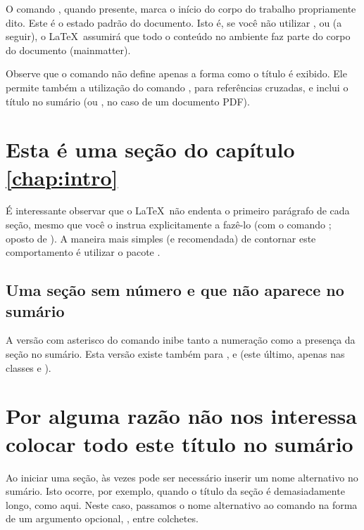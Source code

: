 \documentclass[a4paper,12pt]{book}
\begin{document}
	O comando , quando presente, marca o início do corpo do
	trabalho propriamente dito. Este é o estado padrão do documento. Isto é, se
	você não utilizar ,  ou  (a
	seguir), o \LaTeX\ assumirá que todo o conteúdo no ambiente 
	faz	parte do corpo do	documento (mainmatter).	
	
	Observe que o comando  não define apenas a forma como o título é
	exibido. Ele permite também a utilização do comando , para
	referências cruzadas, e inclui o título no sumário (ou ,
	no caso de um documento PDF).
	
	\section{Esta é uma seção do capítulo \ref{chap:intro}}
		\label{sec:sec}
		
	É interessante observar que o \LaTeX\ não endenta o primeiro parágrafo de 
	cada seção, mesmo que você o instrua explicitamente a fazê-lo (com o comando
	; oposto de ). A maneira mais simples (e recomendada)
	de contornar este comportamento é utilizar o pacote .
	
	\subsection*{Uma seção sem número e que não aparece no sumário}
		
	A versão com asterisco do comando  inibe tanto a numeração
	como a presença da seção no sumário. Esta versão existe também para
	,	 e  (este último, apenas nas
	classes	 e ).
		
	\section[Título alternativo]{Por alguma razão não nos interessa colocar todo
	este título no sumário}
		
	Ao iniciar uma seção, às vezes pode ser necessário inserir um nome
	alternativo	no sumário. Isto ocorre, por exemplo, quando o título da seção é
	demasiadamente longo, como aqui. Neste caso, passamos o nome alternativo ao
	comando  na forma de um argumento opcional, \ie, entre colchetes.
	
\end{document}
